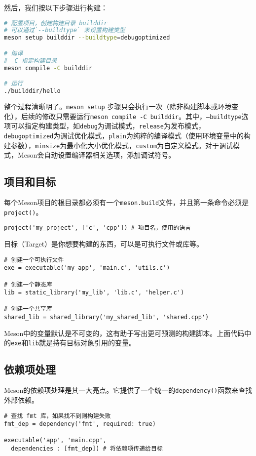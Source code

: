 然后，我们按以下步骤进行构建：
\begin{lstlisting}[language=bash]
# 配置项目，创建构建目录 builddir
# 可以通过`--buildtype` 来设置构建类型
meson setup builddir --buildtype=debugoptimized

# 编译
# -C 指定构建目录
meson compile -C builddir

# 运行
./builddir/hello
\end{lstlisting}

整个过程清晰明了。\texttt{meson setup} 步骤只会执行一次（除非构建脚本或环境变化），后续的修改只需要运行\texttt{meson compile -C builddir}。其中，\texttt{--buildtype}选项可以指定构建类型，如\texttt{debug}为调试模式，\texttt{release}为发布模式，\texttt{debugoptimized}为调试优化模式，\texttt{plain}为纯粹的编译模式（使用环境变量中的构建参数），\texttt{minsize}为最小化大小优化模式，\texttt{custom}为自定义模式。对于调试模式，Meson会自动设置编译器相关选项，添加调试符号。

\subsection{项目和目标}
每个Meson项目的根目录都必须有一个\texttt{meson.build}文件，并且第一条命令必须是\texttt{project()}。
\begin{lstlisting}
project('my_project', ['c', 'cpp']) # 项目名，使用的语言
\end{lstlisting}

目标（Target）是你想要构建的东西，可以是可执行文件或库等。
\begin{lstlisting}
# 创建一个可执行文件
exe = executable('my_app', 'main.c', 'utils.c')

# 创建一个静态库
lib = static_library('my_lib', 'lib.c', 'helper.c')

# 创建一个共享库
shared_lib = shared_library('my_shared_lib', 'shared.cpp')
\end{lstlisting}

Meson中的变量默认是不可变的，这有助于写出更可预测的构建脚本。上面代码中的\texttt{exe}和\texttt{lib}就是持有目标对象引用的变量。

\subsection{依赖项处理}
Meson的依赖项处理是其一大亮点。它提供了一个统一的\texttt{dependency()}函数来查找外部依赖。
\begin{lstlisting}
# 查找 fmt 库，如果找不到则构建失败
fmt_dep = dependency('fmt', required: true)

executable('app', 'main.cpp',
  dependencies : [fmt_dep]) # 将依赖项传递给目标
\end{lstlisting}

